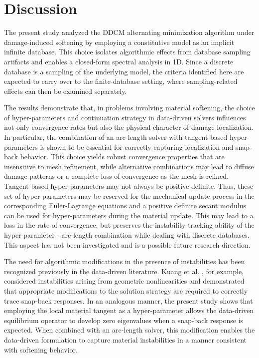 \documentclass[10pt]{cas-sc}
\begin{document}
%	


\section{Discussion}

The present study analyzed the DDCM alternating minimization algorithm under damage-induced softening by employing a constitutive model as an implicit infinite database. This choice isolates algorithmic effects from database sampling artifacts and enables a closed-form spectral analysis in 1D. Since a discrete database is a sampling of the underlying model, the criteria identified here are expected to carry over to the finite-database setting, where sampling-related effects can then be examined separately.

The results demonstrate that, in problems involving material softening, the choice of hyper-parameters and continuation strategy in data-driven solvers influences not only convergence rates but also the physical character of damage localization. In particular, the combination of an arc-length solver with tangent-based hyper-parameters is shown to be essential for correctly capturing localization and snap-back behavior. This choice yields robust convergence properties that are insensitive to mesh refinement, while alternative combinations may lead to diffuse damage patterns or a complete loss of convergence as the mesh is refined. Tangent-based hyper-parameters may not always be positive definite. Thus, these set of hyper-parameters may be reserved for the mechanical update process in the corresponding Euler-Lagrange equations and a positive definite secant modulus can be used for hyper-parameters during the material update. This may lead to a loss in the rate of convergence, but preserves the instability tracking ability of the hyper-parameter - arc-length combination while dealing with discrete databases. This aspect has not been investigated and is a possible future research direction.

The need for algorithmic modifications in the presence of instabilities has been recognized previously in the data-driven literature. Kuang et al. \cite{Kuang2023}, for example, considered instabilities arising from geometric nonlinearities and demonstrated that appropriate modifications to the solution strategy are required to correctly trace snap-back responses. In an analogous manner, the present study shows that employing the local material tangent as a hyper-parameter allows the data-driven equilibrium operator to develop zero eigenvalues when a snap-back response is expected. When combined with an arc-length solver, this modification enables the data-driven formulation to capture material instabilities in a manner consistent with softening behavior.
\end{document}

